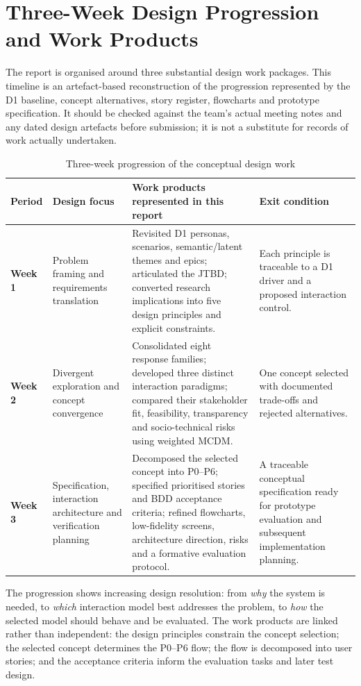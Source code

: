 \documentclass[12pt,a4paper]{article}
\begin{document}
\clearpage
\section{Three-Week Design Progression and Work Products}

The report is organised around three substantial design work packages. This timeline is an artefact-based reconstruction of the progression represented by the D1 baseline, concept alternatives, story register, flowcharts and prototype specification. It should be checked against the team's actual meeting notes and any dated design artefacts before submission; it is not a substitute for records of work actually undertaken.

\begin{table}[ht]
\centering
\small
\caption{Three-week progression of the conceptual design work}
\label{tab:three-week}
\begin{tabularx}{\textwidth}{|p{1.5cm}|p{3.2cm}|X|p{3.2cm}|}
\toprule
\textbf{Period} & \textbf{Design focus} & \textbf{Work products represented in this report} & \textbf{Exit condition}\\
\midrule
\textbf{Week 1} & Problem framing and requirements translation & Revisited D1 personas, scenarios, semantic/latent themes and epics; articulated the JTBD; converted research implications into five design principles and explicit constraints. & Each principle is traceable to a D1 driver and a proposed interaction control.\\
\rowcolor{brandlight}
\textbf{Week 2} & Divergent exploration and concept convergence & Consolidated eight response families; developed three distinct interaction paradigms; compared their stakeholder fit, feasibility, transparency and socio-technical risks using weighted MCDM. & One concept selected with documented trade-offs and rejected alternatives.\\
\textbf{Week 3} & Specification, interaction architecture and verification planning & Decomposed the selected concept into P0--P6; specified prioritised stories and BDD acceptance criteria; refined flowcharts, low-fidelity screens, architecture direction, risks and a formative evaluation protocol. & A traceable conceptual specification ready for prototype evaluation and subsequent implementation planning.\\
\bottomrule
\end{tabularx}
\end{table}

The progression shows increasing design resolution: from \emph{why} the system is needed, to \emph{which} interaction model best addresses the problem, to \emph{how} the selected model should behave and be evaluated. The work products are linked rather than independent: the design principles constrain the concept selection; the selected concept determines the P0--P6 flow; the flow is decomposed into user stories; and the acceptance criteria inform the evaluation tasks and later test design.
\end{document}
